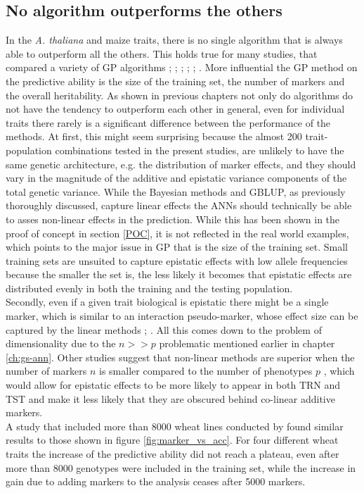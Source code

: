 \subsection{No algorithm outperforms the others}

In the \textit{A. thaliana} and maize traits, there is no single algorithm that is always
able to outperform all the others. This holds true for many studies, that compared a
variety of GP algorithms \cite{dlc2009}; \cite{heslot2012genomic};
\cite{blondel2015ranking}; \cite{Ramstein_2016}; \cite{roorkiwal2016genome};
\cite{azodi2019}. More influential the GP method on the predictive ability is the size of
the training set, the number of markers and the overall heritability. As shown in previous
chapters not only do algorithms do not have the tendency to outperform each other in
general, even for individual traits there rarely is a significant difference between the
performance of the methods. At first, this might seem surprising because the almost 200
trait-population combinations tested in the present studies, are unlikely to have the same
genetic architecture, e.g. the distribution of marker effects, and they should vary in the
magnitude of the additive and epistatic variance components of the total genetic
variance. While the Bayesian methods and GBLUP, as previously thoroughly discussed,
capture linear effects the ANNs should technically be able to asses non-linear effects in
the prediction. While this has been shown in the proof of concept in section \ref{POC}, it
is not reflected in the real world examples, which points to the major issue in GP that is
the size of the training set. Small training sets are unsuited to capture epistatic
effects with low allele frequencies because the smaller the set is, the less likely it
becomes that epistatic effects are distributed evenly in both the training and the testing
population.\\
Secondly, even if a given trait biological is epistatic there might be a single marker,
which is similar to an interaction pseudo-marker, whose effect size can be captured by the
linear methods \cite{hill2008data}; \cite{monir2018dominance}. All this comes down to the
problem of dimensionality due to the $n >> p$ problematic mentioned earlier in chapter
\ref{ch:gs-ann}. Other studies suggest that non-linear methods are superior when the
number of markers $n$ is smaller compared to the number of phenotypes $p$
\cite{azodi2019}, which would allow for epistatic effects to be more likely to appear in
both TRN and TST and make it less likely that they are obscured behind co-linear
additive markers.\\
A study that included more than 8000 wheat lines conducted by \cite{Norman_2018} found
similar results to those shown in figure \ref{fig:marker_vs_acc}. For four different wheat
traits the increase of the predictive ability did not reach a plateau, even after more than
8000 genotypes were included in the training set, while the increase in gain due to adding
markers to the analysis ceases after 5000 markers.


